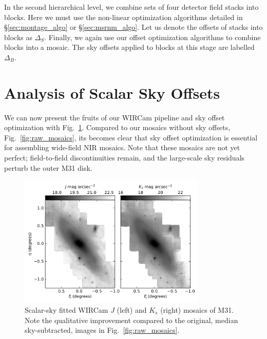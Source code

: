 \documentclass[iop]{emulateapj}
\newcommand{\comment}[1]{\textcolor{purple}{#1}} %
\newcommand{\Fig}[1]{Fig.~\ref{fig:#1}}  %
\newcommand{\Tab}[1]{Table~\ref{tab:#1}}  %
\newcommand{\Sec}[1]{\S\ref{sec:#1}}  %
\begin{document}
In the second hierarchical level, we combine sets of four detector field stacks into blocks.
Here we must use the non-linear optimization algorithms detailed in \Sec{montage_algo} or \Sec{msrnm_algo}.
Let us denote the offsets of stacks into blocks as $\Delta_S$. Finally, we again use our offset optimization algorithms to combine blocks into a mosaic. The sky offsets applied to blocks at this stage are labelled $\Delta_B$.

\section{Analysis of Scalar Sky Offsets}
\label{sec:scalaranalysis}


We can now present the fruits of our WIRCam pipeline and sky offset optimization with \Fig{scalar_mosaics}.
Compared to our mosaics without sky offsets, \Fig{raw_mosaics}, its becomes clear that sky offset optimization is essential for assembling wide-field NIR mosaics.
Note that these mosaics are not yet perfect; field-to-field discontinuities remain, and the large-scale sky residuals perturb the outer M31 disk.

\begin{figure}[t]
	\centering
		\includegraphics[width=3.5in]{figs/scalar_mosaics}
	\caption{Scalar-sky fitted WIRCam $J$ (left) and $K_s$ (right) mosaics of M31. Note the qualitative improvement compared to the original, median sky-subtracted, images in \Fig{raw_mosaics}.}
	\label{fig:scalar_mosaics}
\end{figure}
\end{document}
